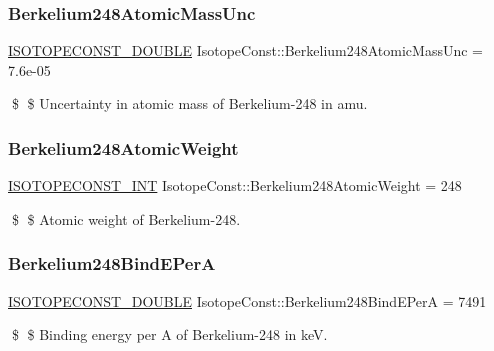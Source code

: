 \subsubsection{\texorpdfstring{Berkelium248\+Atomic\+Mass\+Unc}{Berkelium248AtomicMassUnc}}
{\footnotesize\ttfamily \mbox{\hyperlink{group___isotope_const-_macros_ga8f45a7272ce02c0b4c65c44636ed719a}{I\+S\+O\+T\+O\+P\+E\+C\+O\+N\+S\+T\+\_\+\+D\+O\+U\+B\+LE}} Isotope\+Const\+::\+Berkelium248\+Atomic\+Mass\+Unc = 7.\+6e-\/05}

\$ \$ Uncertainty in atomic mass of Berkelium-\/248 in amu. \mbox{\label{group___isotope_const-_berkelium-_bk248_ga512382a1b4c209a40fc9493a104e4b00}} 
\subsubsection{\texorpdfstring{Berkelium248\+Atomic\+Weight}{Berkelium248AtomicWeight}}
{\footnotesize\ttfamily \mbox{\hyperlink{group___isotope_const-_macros_ga5f18360b3e99483a35c32d789e62621c}{I\+S\+O\+T\+O\+P\+E\+C\+O\+N\+S\+T\+\_\+\+I\+NT}} Isotope\+Const\+::\+Berkelium248\+Atomic\+Weight = 248}

\$ \$ Atomic weight of Berkelium-\/248. \mbox{\label{group___isotope_const-_berkelium-_bk248_ga22f85abac58832eb76c212fbf82770db}} 
\subsubsection{\texorpdfstring{Berkelium248\+Bind\+E\+PerA}{Berkelium248BindEPerA}}
{\footnotesize\ttfamily \mbox{\hyperlink{group___isotope_const-_macros_ga8f45a7272ce02c0b4c65c44636ed719a}{I\+S\+O\+T\+O\+P\+E\+C\+O\+N\+S\+T\+\_\+\+D\+O\+U\+B\+LE}} Isotope\+Const\+::\+Berkelium248\+Bind\+E\+PerA = 7491}

\$ \$ Binding energy per A of Berkelium-\/248 in keV. \mbox{\label{group___isotope_const-_berkelium-_bk248_ga07a414211596fa5cb359446d0a2ee0be}} 
